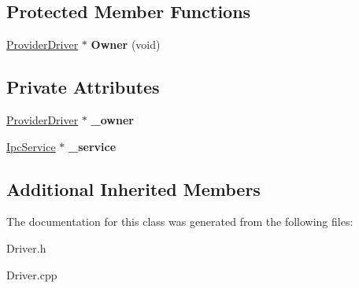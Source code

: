 \subsection*{Protected Member Functions}
\begin{DoxyCompactItemize}
\item 
\mbox{\label{class_provider_driver_1_1_service_aa2bf46823077839182b5f3bea31365ca}} 
\hyperlink{class_provider_driver}{Provider\+Driver} $\ast$ {\bfseries Owner} (void)
\end{DoxyCompactItemize}
\subsection*{Private Attributes}
\begin{DoxyCompactItemize}
\item 
\mbox{\label{class_provider_driver_1_1_service_a156460a8b7e487f7a78122f23e2d6c0b}} 
\hyperlink{class_provider_driver}{Provider\+Driver} $\ast$ {\bfseries \+\_\+owner}
\item 
\mbox{\label{class_provider_driver_1_1_service_a65e75d0c5631e66114e49e34ce4af5e0}} 
\hyperlink{class_ipc_service}{Ipc\+Service} $\ast$ {\bfseries \+\_\+service}
\end{DoxyCompactItemize}
\subsection*{Additional Inherited Members}


The documentation for this class was generated from the following files\+:\begin{DoxyCompactItemize}
\item 
Driver.\+h\item 
Driver.\+cpp\end{DoxyCompactItemize}
